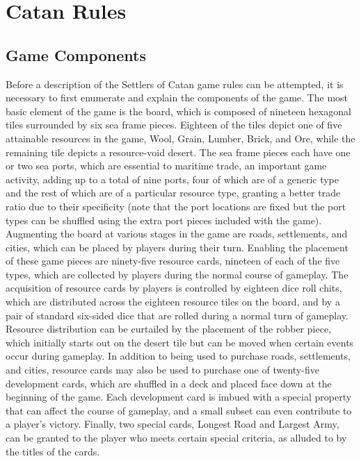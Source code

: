 \documentclass[pageno]{jpaper}
\begin{document}
\begin{doublespacing}
\hypertarget{sec:catan_rules}{}
\section{Catan Rules \cite{catanwebrules}}

\hypertarget{sec:game_components}{}
\subsection{Game Components}

Before a description of the Settlers of Catan game rules can be attempted, it is necessary to first enumerate and explain the components of the game. The most basic element of the game is the board, which is composed of nineteen hexagonal tiles surrounded by six sea frame pieces. Eighteen of the tiles depict one of five attainable resources in the game, Wool, Grain, Lumber, Brick, and Ore, while the remaining tile depicts a resource-void desert. The sea frame pieces each have one or two sea ports, which are essential to maritime trade, an important game activity, adding up to a total of nine ports, four of which are of a generic type and the rest of which are of a particular resource type, granting a better trade ratio due to their specificity (note that the port locations are fixed but the port types can be shuffled using the extra port pieces included with the game). Augmenting the board at various stages in the game are roads, settlements, and cities, which can be placed by players during their turn. Enabling the placement of these game pieces are ninety-five resource cards, nineteen of each of the five types, which are collected by players during the normal course of gameplay. The acquisition of resource cards by players is controlled by eighteen dice roll chits, which are distributed across the eighteen resource tiles on the board, and by a pair of standard six-sided dice that are rolled during a normal turn of gameplay. Resource distribution can be curtailed by the placement of the robber piece, which initially starts out on the desert tile but can be moved when certain events occur during gameplay. In addition to being used to purchase roads, settlements, and cities, resource cards may also be used to purchase one of twenty-five development cards, which are shuffled in a deck and placed face down at the beginning of the game. Each development card is imbued with a special property that can affect the course of gameplay, and a small subset can even contribute to a player's victory. Finally, two special cards, Longest Road and Largest Army, can be granted to the player who meets certain special criteria, as alluded to by the titles of the cards.


\end{doublespacing}
\end{document}
